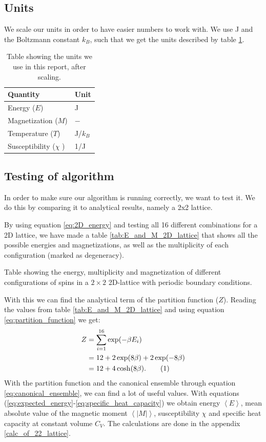 \documentclass[reprint, english,notitlepage,nofootinbib]{revtex4-1}  %
\newcommand\numberthis{\addtocounter{equation}{1}\tag{\theequation}}
\begin{document}
\subsection{Units}

We scale our units in order to have easier numbers to work with. We use J and the Boltzmann constant $k_B$, such that we get the units described by table \ref{tab:units}.

\begin{table}[h]
	\begin{tabular}{||l|l||}
		\hline
		Quantity             & Unit   \\
		\hline
		Energy ($E$)              & J      \\
		\hline
		Magnetization ($M$)        & $-$      \\
		\hline
		Temperature ($T$)        & J/$k_B$ \\
		\hline
		Susceptibility ($\chi$ ) & 1/J   \\
		\hline
	\end{tabular}
	\caption{Table showing the units we use in this report, after scaling.}
	\label{tab:units}
\end{table}

\subsection{Testing of algorithm}

In order to make sure our algorithm is running correctly, we want to test it. We do this by comparing it to analytical results, namely a 2x2 lattice.

By using equation \eqref{eq:2D_energy} and testing all 16 different combinations for a 2D lattice, we have made a table \ref{tab:E_and_M_2D_lattice} that shows all the possible energies and magnetizations, as well as the multiplicity of each configuration (marked as degeneracy).
\begin{table}[h]
	
	\caption{Table showing the energy, multiplicity and magnetization of different configurations of spins in a $2 \times 2$ 2D-lattice with periodic boundary conditions.}
	\label{tab:E_and_M_2D_lattice}
\end{table}
With this we can find the analytical term of the partition function ($Z$). Reading the values from table \ref{tab:E_and_M_2D_lattice} and using equation \eqref{eq:partition_function} we get:
\begin{align*}
Z &= \sum_{i = 1}^{16} \exp(-\beta E_i) \\
&= 12 + 2\exp(8\beta) + 2\exp(-8\beta) \\
&= 12 + 4\cosh(8\beta). \numberthis \label{eq:2Dpartition_function}
\end{align*}
With the partition function and the canonical ensemble through equation \eqref{eq:canonical_ensemble}, we can find a lot of useful values. With equations (\ref{eq:expected_energy}-\ref{eq:specific_heat_capacity}) we obtain energy $\left<E\right	>$, mean absolute value of the magnetic moment $\left<|M|\right>$, susceptibility $\chi$ and specific heat capacity at constant volume $C_V$. The calculations are done in the appendix \ref{calc_of_22_lattice}.
\end{document}
